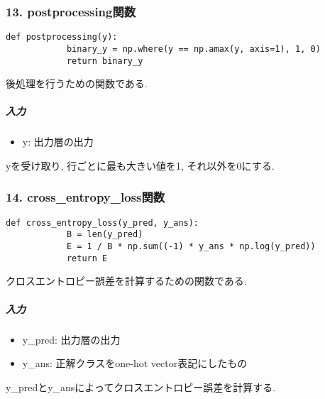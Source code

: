 \documentclass[a4j, titlepage]{jarticle}
\begin{document}
    \subsubsection*{13. postprocessing関数}
        \begin{lstlisting}[caption=後処理,label=fuga]
        def postprocessing(y):
            binary_y = np.where(y == np.amax(y, axis=1), 1, 0)
            return binary_y
        \end{lstlisting}
        後処理を行うための関数である.
            \subparagraph*{入力}
            \begin{itemize}
                \item y: 出力層の出力
            \end{itemize}
            yを受け取り, 行ごとに最も大きい値を1, それ以外を0にする.

    \subsubsection*{14. cross\_entropy\_loss関数}
        \begin{lstlisting}[caption=クロスエントロピー誤差の計算,label=fuga]
        def cross_entropy_loss(y_pred, y_ans):
            B = len(y_pred)
            E = 1 / B * np.sum((-1) * y_ans * np.log(y_pred))
            return E
        \end{lstlisting}
        クロスエントロピー誤差を計算するための関数である.
            \subparagraph*{入力}
            \begin{itemize}
                \item y\_pred: 出力層の出力
                \item y\_ans: 正解クラスをone-hot vector表記にしたもの
            \end{itemize}
            y\_predとy\_ansによってクロスエントロピー誤差を計算する.
\end{document}
